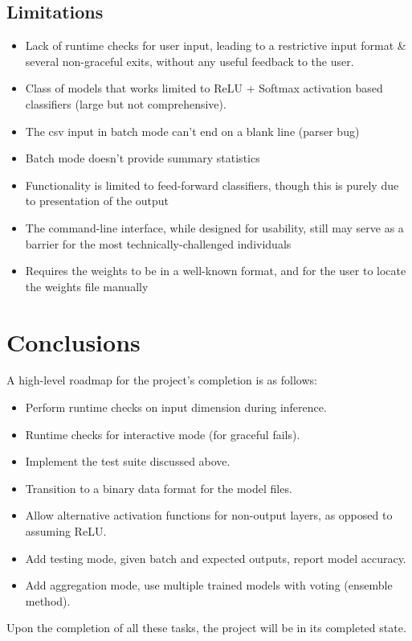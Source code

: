 \documentclass[12pt, titlepage]{article}
\begin{document}
\subsection{Limitations}
\begin{itemize}
	\item Lack of runtime checks for user input, leading to a restrictive input format \& several non-graceful exits, without any useful feedback to the user.
	\item Class of models that works limited to ReLU + Softmax activation based classifiers (large but not comprehensive).
	\item The csv input in batch mode can't end on a blank line (parser bug)
	\item Batch mode doesn't provide summary statistics
	
	\item Functionality is limited to feed-forward classifiers, though this is purely due to presentation of the output
	\item The command-line interface, while designed for usability, still may serve as a barrier for the most technically-challenged individuals
	\item Requires the weights to be in a well-known format, and for the user to locate the weights file manually
\end{itemize}

\section{Conclusions}
A high-level roadmap for the project's completion is as follows:
\begin{itemize}
	\item Perform runtime checks on input dimension during inference.
	\item Runtime checks for interactive mode (for graceful fails).
	\item Implement the test suite discussed above.
	\item Transition to a binary data format for the model files.
	\item Allow alternative activation functions for non-output layers, as opposed to assuming ReLU.
	\item Add testing mode, given batch and expected outputs, report model accuracy.
	\item Add aggregation mode, use multiple trained models with voting (ensemble method).
\end{itemize}
Upon the completion of all these tasks, the project will be in its completed state.\bigskip
\end{document}

